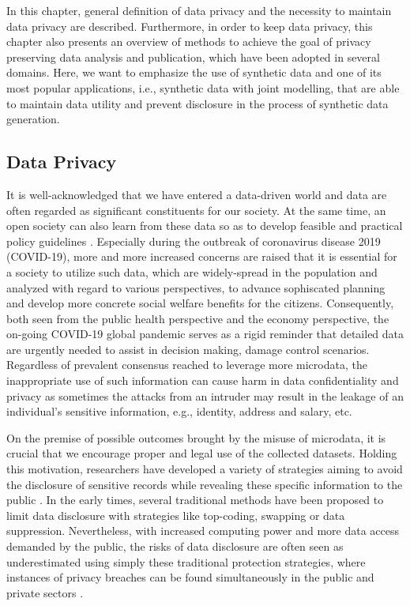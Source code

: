 In this chapter, general definition of data privacy and the necessity to maintain data privacy are described. 
Furthermore, in order to keep data privacy, this chapter also presents an overview of methods to achieve the 
goal of privacy preserving data analysis and publication, which have been adopted in several domains. 
Here, we want to emphasize the use of synthetic data and one of its most popular applications, 
i.e., synthetic data with joint modelling, that are able to maintain data utility and prevent disclosure in the process of synthetic data generation.

\subsection{Data Privacy}
\label{subsec:dataprivacy}
It is well-acknowledged that we have entered a data-driven world and data are 
often regarded as significant constituents for our society. At the same time, 
an open society can also learn from these data so as to develop feasible 
and practical policy guidelines \citep{evans2021statistically}. Especially 
during the outbreak of coronavirus disease 2019 (COVID-19), more and more increased concerns are raised that it is 
essential for a society to utilize such data, which are widely-spread in the population
and analyzed with regard to various perspectives, to advance sophiscated planning
and develop more concrete social welfare benefits for the citizens. Consequently,
both seen from the public health perspective and the economy perspective, the on-going
COVID-19 global pandemic serves as a rigid reminder that detailed data are urgently 
needed to assist in decision making, damage control scenarios. Regardless of prevalent
consensus reached to leverage more microdata, the inappropriate use of such 
information can cause harm in data confidentiality and privacy as sometimes the attacks
from an intruder may result in the leakage of an individual's sensitive information, e.g., identity, 
address and salary, etc.


On the premise of possible outcomes brought by the misuse of microdata, it is crucial that 
we encourage proper and legal use of the collected datasets. Holding this motivation, researchers 
have developed a variety of strategies aiming to avoid the disclosure of sensitive records while
revealing these specific information to the public \citep{duncan2011statistical}. In the early times, 
several traditional methods have been proposed to limit data disclosure with strategies like top-coding,
swapping or data suppression. Nevertheless, with increased computing power and more data access demanded by
the public, the risks of data disclosure are often seen as underestimated using simply these traditional
protection strategies, where instances of privacy breaches can be found simultaneously in the public and 
private sectors \citep{de2015unique}.

